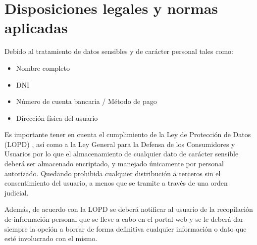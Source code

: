 \section{Disposiciones legales y normas aplicadas}
\par Debido al tratamiento de datos sensibles y de carácter personal tales como:
\begin{itemize}
	\item Nombre completo
	\item DNI
	\item Número de cuenta bancaria / Método de pago
	\item Dirección física del usuario
\end{itemize}
\par Es importante tener en cuenta el cumplimiento de la Ley de Protección de Datos (LOPD) \cite{LAW:LOPD}, así como a la Ley General para la Defensa de los Consumidores y Usuarios \cite{LAW:LGDCU}  por lo que el almacenamiento de cualquier dato de carácter sensible deberá ser almacenado encriptado, y manejado únicamente por personal autorizado. Quedando prohibida cualquier distribución a terceros sin el consentimiento del usuario, a menos que se tramite a través de una orden judicial.

\par Además, de acuerdo con la LOPD se deberá notificar al usuario de la recopilación de información personal que se lleve a cabo en el portal web y se le deberá dar siempre la opción a borrar de forma definitiva cualquier información o dato que esté involucrado con el mismo.
